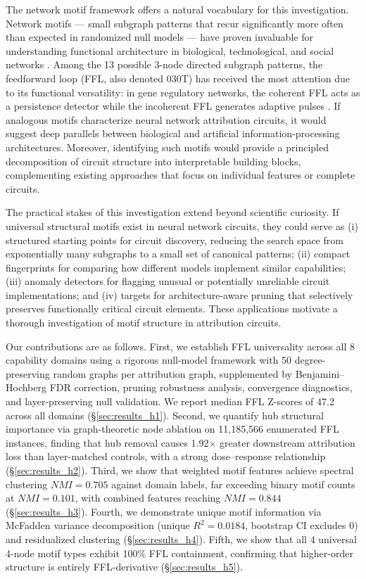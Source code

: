 The network motif framework offers a natural vocabulary for this investigation. Network motifs --- small subgraph patterns that recur significantly more often than expected in randomized null models --- have proven invaluable for understanding functional architecture in biological, technological, and social networks \cite{milo2002network, milo2004superfamilies}. Among the 13 possible 3-node directed subgraph patterns, the feedforward loop (FFL, also denoted 030T) has received the most attention due to its functional versatility: in gene regulatory networks, the coherent FFL acts as a persistence detector while the incoherent FFL generates adaptive pulses \cite{alon2007network}. If analogous motifs characterize neural network attribution circuits, it would suggest deep parallels between biological and artificial information-processing architectures. Moreover, identifying such motifs would provide a principled decomposition of circuit structure into interpretable building blocks, complementing existing approaches that focus on individual features or complete circuits.

The practical stakes of this investigation extend beyond scientific curiosity. If universal structural motifs exist in neural network circuits, they could serve as (i) structured starting points for circuit discovery, reducing the search space from exponentially many subgraphs to a small set of canonical patterns; (ii) compact fingerprints for comparing how different models implement similar capabilities; (iii) anomaly detectors for flagging unusual or potentially unreliable circuit implementations; and (iv) targets for architecture-aware pruning that selectively preserves functionally critical circuit elements. These applications motivate a thorough investigation of motif structure in attribution circuits.

Our contributions are as follows. First, we establish FFL universality across all 8 capability domains using a rigorous null-model framework with 50 degree-preserving random graphs per attribution graph, supplemented by Benjamini--Hochberg FDR correction, pruning robustness analysis, convergence diagnostics, and layer-preserving null validation. We report median FFL Z-scores of 47.2 across all domains (\S\ref{sec:results_h1}). Second, we quantify hub structural importance via graph-theoretic node ablation on 11,185,566 enumerated FFL instances, finding that hub removal causes 1.92$\times$ greater downstream attribution loss than layer-matched controls, with a strong dose--response relationship (\S\ref{sec:results_h2}). Third, we show that weighted motif features achieve spectral clustering $NMI=0.705$ against domain labels, far exceeding binary motif counts at $NMI=0.101$, with combined features reaching $NMI=0.844$ (\S\ref{sec:results_h3}). Fourth, we demonstrate unique motif information via McFadden variance decomposition (unique $R^2=0.0184$, bootstrap CI excludes 0) and residualized clustering (\S\ref{sec:results_h4}). Fifth, we show that all 4 universal 4-node motif types exhibit 100\% FFL containment, confirming that higher-order structure is entirely FFL-derivative (\S\ref{sec:results_h5}).

